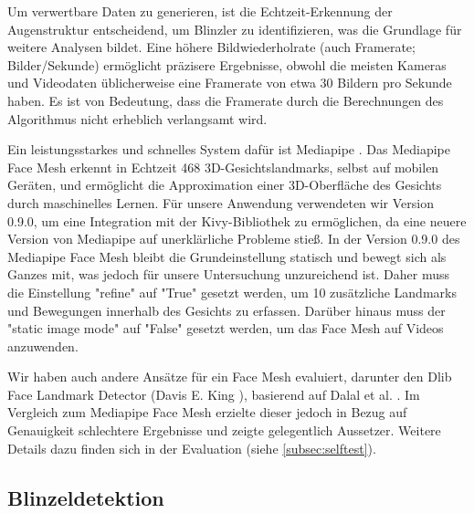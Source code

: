 Um verwertbare Daten zu generieren, ist die Echtzeit-Erkennung der Augenstruktur entscheidend, um Blinzler zu identifizieren, was die Grundlage für weitere Analysen bildet. Eine höhere Bildwiederholrate (auch Framerate; Bilder/Sekunde) ermöglicht präzisere Ergebnisse, obwohl die meisten Kameras und Videodaten üblicherweise eine Framerate von etwa 30 Bildern pro Sekunde haben. Es ist von Bedeutung, dass die Framerate durch die Berechnungen des Algorithmus nicht erheblich verlangsamt wird. 

Ein leistungsstarkes und schnelles System dafür ist Mediapipe \cite{LU19}. Das Mediapipe Face Mesh erkennt in Echtzeit 468 3D-Gesichtslandmarks, selbst auf mobilen Geräten, und ermöglicht die Approximation einer 3D-Oberfläche des Gesichts durch maschinelles Lernen. Für unsere Anwendung verwendeten wir Version 0.9.0, um eine Integration mit der Kivy-Bibliothek zu ermöglichen, da eine neuere Version von Mediapipe auf unerklärliche Probleme stieß. In der Version 0.9.0 des Mediapipe Face Mesh bleibt die Grundeinstellung statisch und bewegt sich als Ganzes mit, was jedoch für unsere Untersuchung unzureichend ist. Daher muss die Einstellung "refine" auf "True" gesetzt werden, um 10 zusätzliche Landmarks und Bewegungen innerhalb des Gesichts zu erfassen. Darüber hinaus muss der "static image mode" auf "False" gesetzt werden, um das Face Mesh auf Videos anzuwenden. 

Wir haben auch andere Ansätze für ein Face Mesh evaluiert, darunter den Dlib Face Landmark Detector (Davis E. King \cite{DLIB09}), basierend auf Dalal et al. \cite{DA05}. Im Vergleich zum Mediapipe Face Mesh erzielte dieser jedoch in Bezug auf Genauigkeit schlechtere Ergebnisse und zeigte gelegentlich Aussetzer. Weitere Details dazu finden sich in der Evaluation (siehe \ref{subsec:selftest}).

\subsection{Blinzeldetektion}
\label{sec:blinkdetection}

